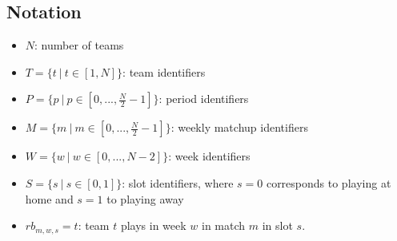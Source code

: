 \documentclass{article}
\begin{document}
\subsection{Notation}
\begin{itemize}
  \item $N$: number of teams
  \item $T=\{t\ |\ t \in [1, N]\}$: team identifiers
  \item $P=\{p\ |\ p \in [0, ..., \frac{N}{2} - 1]\}$: period identifiers
  \item $M=\{m\ |\ m \in [0, ..., \frac{N}{2} - 1]\}$: weekly matchup identifiers
  \item $W=\{w\ |\ w \in [0, ..., N-2]\}$: week identifiers
  \item $S=\{s\ |\ s \in [0,1]\}$: slot identifiers, where $s=0$ corresponds to playing at home and $s=1$ to playing away
  \item $rb_{m, w, s}=t$: team $t$ plays in week $w$ in match $m$ in slot $s$.
  
\end{itemize}











\end{document}
